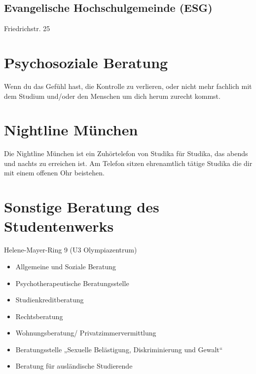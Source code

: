 \subsection*{Evangelische Hochschulgemeinde (ESG)}
Friedrichstr. 25

\begin{urlList}
\end{urlList}

\section{Psychosoziale Beratung}

Wenn du das Gefühl hast, die Kontrolle zu verlieren, oder nicht mehr fachlich mit
dem Studium und/oder den Menschen um dich herum zurecht kommst.

\begin{urlList}
\end{urlList}

\section{Nightline München}

Die Nightline München ist ein Zuhörtelefon von Studika für Studika,
das abends und nachts zu erreichen ist. Am Telefon sitzen ehrenamtlich
tätige Studika die dir mit einem offenen Ohr beistehen.

\begin{urlList}
\end{urlList}


\section{Sonstige Beratung des Studentenwerks}
Helene-Mayer-Ring 9 (U3 Olympiazentrum)

\begin{itemize}
	\item Allgemeine und Soziale Beratung
	\item Psychotherapeutische Beratungsstelle
	\item Studienkreditberatung
	\item Rechtsberatung
	\item Wohnungsberatung/ Privatzimmervermittlung
	\item Beratungsstelle „Sexuelle Belästigung, Diskriminierung und Gewalt“
	\item Beratung für ausländische Studierende
\end{itemize}

\begin{urlList}
\end{urlList}

